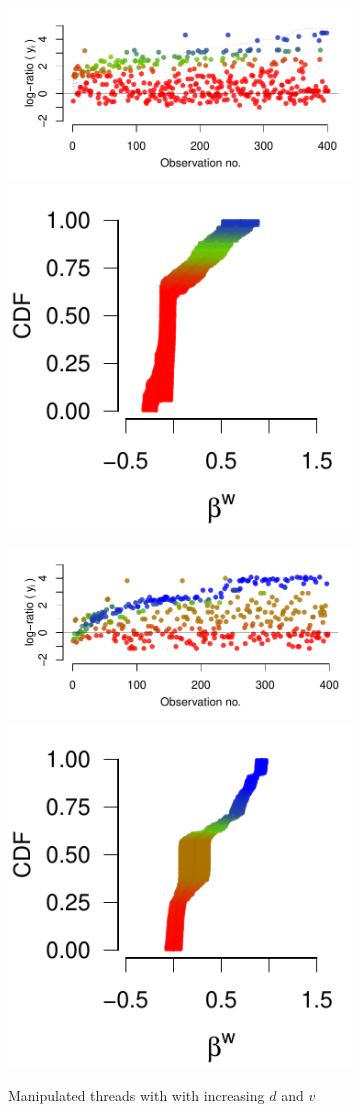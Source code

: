 \documentclass[9pt,a4paper,twocolumn,lineno]{article}
\begin{document}
\begin{figure}
\begin{subfigure}{.49\linewidth}
		{\includegraphics[width=.65\linewidth]{threads/thread_max_403_9}			\includegraphics[width=.33\linewidth]{betas/beta_max_403_9}}
		
		{\includegraphics[width=.65\linewidth]{threads/thread_max_1097_9}			\includegraphics[width=.33\linewidth]{betas/beta_max_1097_9}}

		\vspace{10px}
		\hspace{10px}
		Manipulated threads with with increasing $d$ and $v$

		\label{fig:supp max}
	\end{subfigure}
	

\end{figure}
\end{document}
